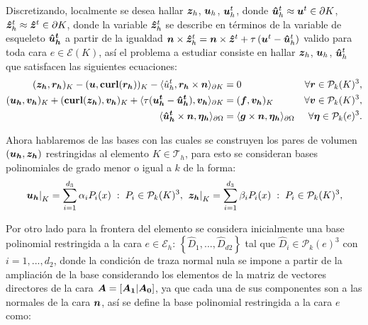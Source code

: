 \documentclass{article}
\begin{document}
\noindent Discretizando, localmente se desea hallar $\boldsymbol{z}_h$, $\boldsymbol{u}_h$, $\boldsymbol{u}^t_h$, donde $\boldsymbol{\hat{u}}^t_h \approx \boldsymbol{u}^t \in \partial K$, $\boldsymbol{\hat{z}}^t_h \approx \boldsymbol{\hat{z}}^t \in \partial K$, donde la variable $\boldsymbol{\hat{z}}_h^t$ se describe en términos de la variable de esqueleto $\boldsymbol{\hat{u}_h^t}$ a partir de la igualdad $\boldsymbol{n} \times \boldsymbol{\hat{z}}^t_h = \boldsymbol{n} \times \boldsymbol{\hat{z}}^t + \tau \left( \boldsymbol{u}^t - \boldsymbol{\hat{u}}^t_h \right)$ valido para toda cara $e \in \mathcal{E}(K)$, así el problema a estudiar consiste en hallar $\boldsymbol{z}_h$, $\boldsymbol{u}_h$, $\boldsymbol{\hat{u}}^t_h$ que satisfacen las siguientes ecuaciones:
\begin{align}
\label{eq:1}
    (\boldsymbol{z_h}, \boldsymbol{r_h})_K - (\boldsymbol{u}, \textbf{\textup{curl}}(\boldsymbol{r_h}))_K - \langle \hat{u}^t_h, \boldsymbol{r_h} \times \boldsymbol{n} \rangle_{\partial K} &= 0 &\forall \boldsymbol{r} \in \mathcal{P}_k(K)^3, \\
    \label{eq:2}
    (\boldsymbol{u_h}, \boldsymbol{v_h})_K + (\textbf{\textup{curl}}(\boldsymbol{z_h}), \boldsymbol{v_h})_K + \langle \tau (\boldsymbol{u_h^t} - \boldsymbol{\hat{u}_h^t}), \boldsymbol{v_h} \rangle_{\partial K} &= (\boldsymbol{f}, \boldsymbol{v_h})_K &\forall \boldsymbol{v} \in \mathcal{P}_k(K)^3,\\
    \label{eq:3}
    \langle \boldsymbol{\hat{u}^t_h} \times \boldsymbol{n}, \boldsymbol{\eta_h} \rangle_{\partial \Omega} &= \langle \boldsymbol{g} \times \boldsymbol{n}, \boldsymbol{\eta_h} \rangle_{\partial \Omega} &\forall \boldsymbol{\eta} \in \mathcal{P}_k(e)^3.
\end{align}

\noindent Ahora hablaremos de las bases con las cuales se construyen los pares de volumen $(\boldsymbol{u_h}, \boldsymbol{z_h})$ restringidas al elemento $K \in \mathcal{T}_h$, para esto se consideran bases polinomiales de grado menor o igual a $k$ de la forma:
\begin{equation*}
    \left . \boldsymbol{u_h} \right |_K = \sum_{i=1}^{d_3} \alpha_i P_i(x)
    \hspace{1mm} : \hspace{1mm} P_i \in \mathcal{P}_k(K)^3,
    \hspace{1 mm}
    \left . \boldsymbol{z_h} \right |_K = \sum_{i=1}^{d_3} \beta_i P_i(x)
    \hspace{1mm} : \hspace{1mm} P_i \in \mathcal{P}_k(K)^3,
\end{equation*}

\noindent Por otro lado para la frontera del elemento se considera inicialmente una base polinomial restringida a la cara $e \in \mathcal{E}_h$: $\left \lbrace \hat{D}_1, ..., \hat{D}_{d2} \right \rbrace$ tal que $\hat{D}_i \in \mathcal{P}_k(e)^3$ con $i = 1, ..., d_2$, donde la condición de traza normal nula se impone a partir de la ampliación de la base considerando los elementos de la matriz de vectores directores de la cara $\boldsymbol{A} = [\boldsymbol{A_1} | \boldsymbol{A_0}]$, ya que cada una de sus componentes son a las normales de la cara $\boldsymbol{n}$, así se define la base polinomial restringida a la cara $e$ como:
\end{document}
